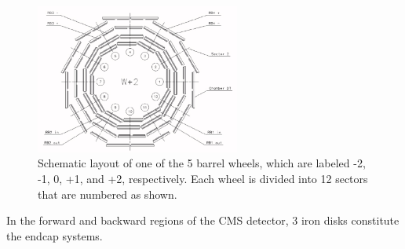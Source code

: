 \begin{figure}[h!]
\centering
\includegraphics[width=0.6\textwidth]{Images/RPC_B}
\caption{Schematic layout of one of the 5 barrel wheels, which are labeled -2, -1, 0, +1, and +2, respectively. Each wheel is divided into 12 sectors that are numbered as shown.}
\label{RPC_B}
\end{figure}
In the forward and backward regions of the CMS detector, 3 iron disks constitute the endcap systems. 


